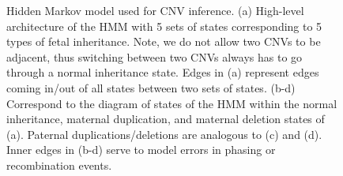 \begin{figure}[t]
\caption{Hidden Markov model used for CNV inference. (a) High-level architecture of the HMM with 5 sets of states corresponding to 5 types of fetal inheritance. Note, we do not allow two CNVs to be adjacent, thus switching between two CNVs always has to go through a normal inheritance state. Edges in (a) represent edges coming in/out of all states between two sets of states. (b-d) Correspond to the diagram of states of the HMM within the normal inheritance, maternal duplication, and maternal deletion states of (a). Paternal duplications/deletions are analogous to (c) and (d). Inner edges in (b-d) serve to model errors in phasing or recombination events.}
\label{fig:hmm_main}
\centering
{}
\hspace{20pt}
\end{figure}
